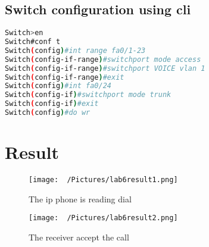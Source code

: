 \documentclass{article}
\begin{document}
\subsection{Switch configuration using cli}
\begin{lstlisting}[language=bash]
Switch>en
Switch#conf t
Switch(config)#int range fa0/1-23
Switch(config-if-range)#switchport mode access
Switch(config-if-range)#switchport VOICE vlan 1
Switch(config-if-range)#exit
Switch(config)#int fa0/24
Switch(config-if)#switchport mode trunk
Switch(config-if)#exit
Switch(config)#do wr
\end{lstlisting}
\section{Result}
\begin{figure}[H]
    \centering
    \texttt{[image: ~/Pictures/lab6result1.png]}
    \caption{The ip phone is reading dial}
\end{figure}
\begin{figure}[H]
    \centering
    \texttt{[image: ~/Pictures/lab6result2.png]}
    \caption{The receiver accept the call}
\end{figure}
\end{document}
